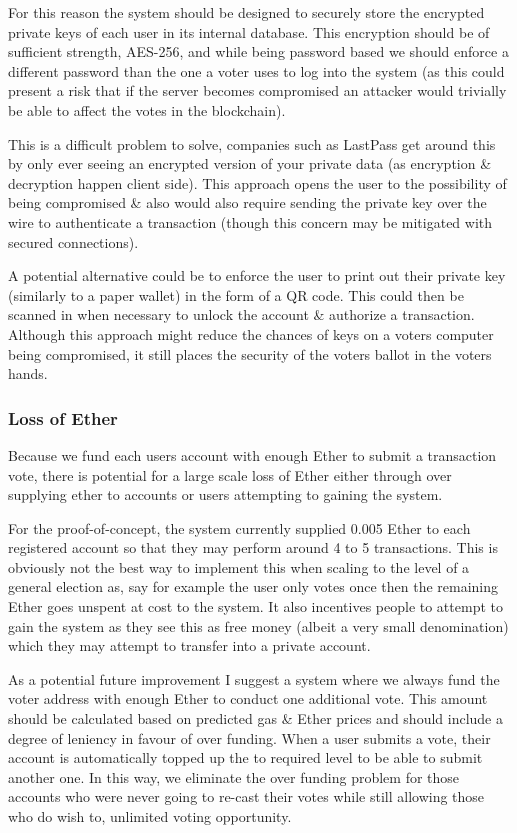 \documentclass{article}
\begin{document}
	For this reason the system should be designed to securely store the encrypted private keys of each user in its internal database. This encryption should be of sufficient strength, AES-256, and while being password based we should enforce a different password than the one a voter uses to log into the system (as this could present a risk that if the server becomes compromised an attacker would trivially be able to affect the votes in the blockchain).

	This is a difficult problem to solve, companies such as LastPass get around this by only ever seeing an encrypted version of your private data (as encryption \& decryption happen client side). This approach opens the user to the possibility of being compromised \& also would also require sending the private key over the wire to authenticate a transaction (though this concern may be mitigated with secured connections).
		
	A potential alternative could be to enforce the user to print out their private key (similarly to a paper wallet) in the form of a QR code. This could then be scanned in when necessary to unlock the account \& authorize a transaction. Although this approach might reduce the chances of keys on a voters computer being compromised, it still places the security of the voters ballot in the voters hands.

	\subsubsection{Loss of Ether}
	\label{sub:LossOfEther}
	Because we fund each users account with enough Ether to submit a transaction vote, there is potential for a large scale loss of Ether either through over supplying ether to accounts or users attempting to gaining the system. 
	
	For the proof-of-concept, the system currently supplied 0.005 Ether to each registered account so that they may perform around 4 to 5 transactions. This is obviously not the best way to implement this when scaling to the level of a general election as, say for example the user only votes once then the remaining Ether goes unspent at cost to the system. It also incentives people to attempt to gain the system as they see this as free money (albeit a very small denomination) which they may attempt to transfer into a private account.
	
	As a potential future improvement I suggest a system where we always fund the voter address with enough Ether to conduct one additional vote. This amount should be calculated based on predicted gas \& Ether prices and should include a degree of leniency in favour of over funding. When a user submits a vote, their account is automatically topped up the to required level to be able to submit another one. In this way, we eliminate the over funding problem for those accounts who were never going to re-cast their votes while still allowing those who do wish to, unlimited voting opportunity.
	
\end{document}
